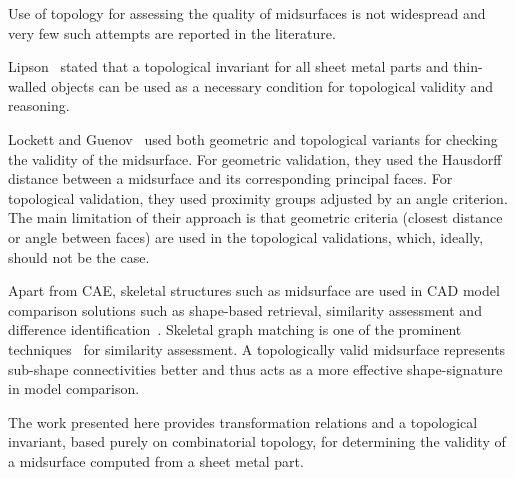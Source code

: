 \documentclass[11pt,a4paper]{article}
\begin{document}
Use of topology for assessing the quality of midsurfaces is not widespread
and very few such attempts are reported in the literature.

Lipson~\cite{Lipson} stated that a topological invariant for all sheet metal
parts and thin-walled objects can be used as a necessary condition for
topological validity and reasoning.

Lockett and Guenov~\cite{Lockett2008} used both geometric and topological
variants for checking the validity of the midsurface. For geometric
validation, they used the Hausdorff distance between a midsurface and its
corresponding principal faces. For topological validation, they used proximity
groups adjusted by an angle criterion. The main limitation of their approach
is that geometric criteria (closest distance or angle between faces) are used
in the topological validations, which, ideally, should not be the case.

%

Apart from CAE, skeletal structures such as midsurface are used in CAD model
comparison solutions such as shape-based retrieval, similarity assessment and
difference identification~\cite{Antoine2014}. Skeletal graph matching is one
of the prominent techniques~\cite{Iyer2005} for similarity assessment. A
topologically valid midsurface represents sub-shape connectivities better and
thus acts as a more effective shape-signature in model comparison.

The work presented here provides transformation relations and a topological
invariant, based purely on combinatorial topology, for determining the validity
of a midsurface computed from a sheet metal part.

\end{document}
